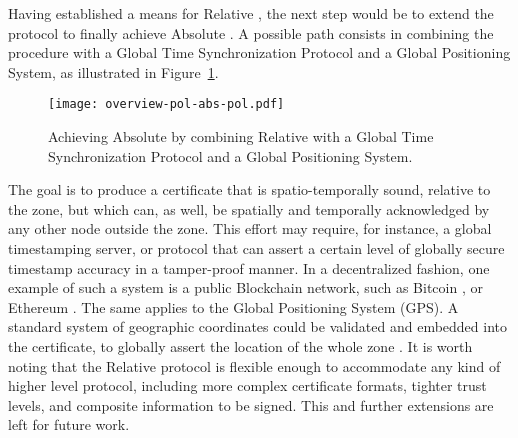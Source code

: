 Having established a means for Relative \pol{}, the next step would be to extend the protocol to finally achieve Absolute \pol{}. A possible path consists in combining the procedure with a Global Time Synchronization Protocol and a Global Positioning System, as illustrated in Figure~\ref{fig:proof-of-location-overview-absolute-pol}.

\begin{figure}[h!]
    \begin{center}
    \texttt{[image: overview-pol-abs-pol.pdf]}
    \caption{Achieving Absolute \pol{} by combining Relative \pol{} with a Global Time Synchronization Protocol and a Global Positioning System.}
    \label{fig:proof-of-location-overview-absolute-pol}
    \end{center}
\end{figure}

The goal is to produce a \pol{} certificate that is spatio-temporally sound, relative to the zone, but which can, as well, be spatially and temporally acknowledged by any other node outside the zone. This effort may require, for instance, a global timestamping server, or protocol that can assert a certain level of globally secure timestamp accuracy in a tamper-proof manner. In a decentralized fashion, one example of such a system is a public Blockchain network, such as Bitcoin \cite{nakamoto2008bitcoin}, or Ethereum \cite{buterin2014next}. The same applies to the Global Positioning System (GPS). A standard system of geographic coordinates could be validated and embedded into the \pol{} certificate, to globally assert the location of the whole zone \cite{amoretti2018blockchain ,nosouhi2020blockchain}. It is worth noting that the Relative \pol{} protocol is flexible enough to accommodate any kind of higher level protocol, including more complex certificate formats, tighter trust levels, and composite information to be signed. This and further extensions are left for future work.